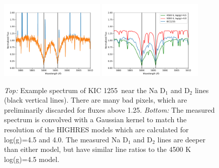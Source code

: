 \documentclass[preprint]{aastex61}
\newcommand{\shStar}{KIC 1255}
\begin{document}
\begin{figure}
\begin{centering}
\includegraphics[width=0.45\textwidth]{images/subaru/Na_D_spec_interp.pdf}
\includegraphics[width=0.45\textwidth]{images/subaru/Na_D_spec.pdf}
\caption{{\it Top:} Example spectrum of \shStar\ near the Na D$_1$ and D$_2$ lines (black vertical lines).
There are many bad pixels, which are preliminarily discarded for fluxes above 1.25.
{\it Bottom:} The measured spectrum is convolved with a Gaussian kernel to match the resolution of the HIGHRES models which are calculated for log(g)=4.5 and 4.0.
The measured Na D$_1$ and D$_2$ lines are deeper than either model, but have similar line ratios to the 4500 K log(g)=4.5 model.}\label{fig:naDlines}
\end{centering}
\end{figure}
\end{document}
